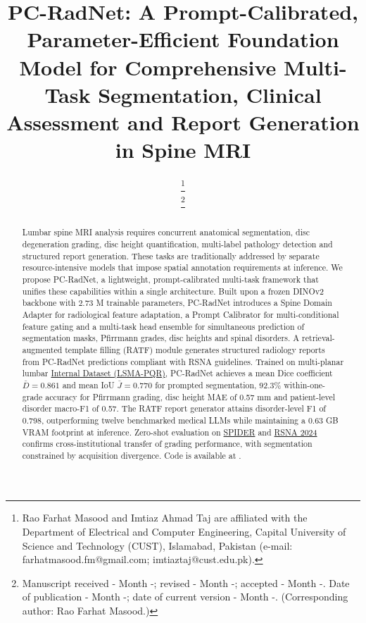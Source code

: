 \documentclass[journal]{IEEEtran}
\newcommand{\modelname}{PC-RadNet}
\begin{document}
\title{PC-RadNet: A Prompt-Calibrated, Parameter-Efficient Foundation Model for Comprehensive Multi-Task Segmentation, Clinical Assessment and Report Generation in Spine MRI}


\author{%
  \thanks{Rao Farhat Masood and Imtiaz Ahmad Taj are affiliated with the Department of Electrical and Computer Engineering, Capital University of Science and Technology (CUST), Islamabad, Pakistan (e-mail: farhatmasood.fm@gmail.com; imtiaztaj@cust.edu.pk).}\\
  \thanks{Manuscript received - Month -; revised - Month -; accepted - Month -. Date of publication - Month -; date of current version - Month -. (Corresponding author: Rao Farhat Masood.) }
}

\maketitle

\begin{abstract}
Lumbar spine MRI analysis requires concurrent anatomical segmentation, disc degeneration grading, disc height quantification, multi-label pathology detection and structured report generation. These tasks are traditionally addressed by separate resource-intensive models that impose spatial annotation requirements at inference. We propose \modelname{}, a lightweight, prompt-calibrated multi-task framework that unifies these capabilities within a single architecture. Built upon a frozen DINOv2 backbone with 2.73 M trainable parameters, \modelname{} introduces a Spine Domain Adapter for radiological feature adaptation, a Prompt Calibrator for multi-conditional feature gating and a multi-task head ensemble for simultaneous prediction of segmentation masks, Pfirrmann grades, disc heights and spinal disorders. A retrieval-augmented template filling (RATF) module generates structured radiology reports from \modelname{} predictions compliant with RSNA guidelines. Trained on multi-planar lumbar \href{https://data.mendeley.com/datasets/p3r4xd2488/1}{Internal Dataset (LSMA-PQR)}, \modelname{} achieves a mean Dice coefficient $\bar{D}=0.861$ and mean IoU $\bar{J}=0.770$ for prompted segmentation, 92.3\% within-one-grade accuracy for Pfirrmann grading, disc height MAE of 0.57 mm and patient-level disorder macro-F1 of 0.57. The RATF report generator attains disorder-level F1 of 0.798, outperforming twelve benchmarked medical LLMs while maintaining a 0.63 GB VRAM footprint at inference. Zero-shot evaluation on \href{https://zenodo.org/records/10159290}{SPIDER} and \href{https://www.kaggle.com/competitions/rsna-2024-lumbar-spine-degenerative-classification/data}{RSNA 2024} confirms cross-institutional transfer of grading performance, with segmentation constrained by acquisition divergence. Code is available at \url{}.
\end{abstract}
\end{document}
